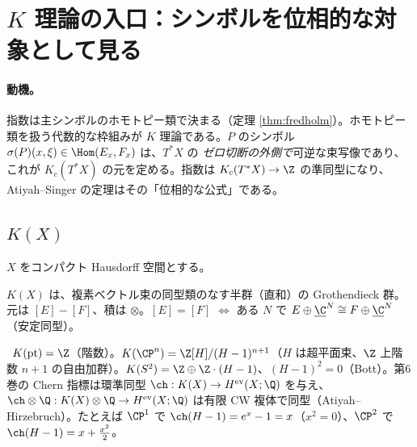 
\section{$K$ 理論の入口：シンボルを位相的な対象として見る}\label{sec:K}
\paragraph{動機。}指数は主シンボルのホモトピー類で決まる（定理 \ref{thm:fredholm}）。ホモトピー類を扱う代数的な枠組みが $K$ 理論である。$P$ のシンボル $\sigma(P)(x,\xi)\in\Hom(E_x,F_x)$ は、$T^*X$ の \emph{ゼロ切断の外側で}可逆な束写像であり、これが $K_c(T^*X)$ の元を定める。指数は $K_c(T^*X)\to\Z$ の準同型になり、Atiyah--Singer の定理はその「位相的な公式」である。

\subsection{$K(X)$}
$X$ をコンパクト Hausdorff 空間とする。
\begin{defn}[$K$ 群]\label{def:K}
$K(X)$ は、複素ベクトル束の同型類のなす半群（直和）の Grothendieck 群。元は $[E]-[F]$、積は $\otimes$。$[E]=[F]$ $\iff$ ある $N$ で $E\oplus\underline\C^N\cong F\oplus\underline\C^N$（安定同型）。
\end{defn}
\begin{ex}\label{ex:Kbasic}\tC\
$K(\mathrm{pt})=\Z$（階数）。$K(\CP^n)=\Z[H]/(H-1)^{n+1}$（$H$ は超平面束、$\Z$ 上階数 $n+1$ の自由加群）。$K(S^2)=\Z\oplus\Z\cdot(H-1)$、$(H-1)^2=0$（Bott）。第6巻の Chern 指標は環準同型 $\ch:K(X)\to H^{\rm ev}(X;\Q)$ を与え、$\ch\otimes\Q:K(X)\otimes\Q\to H^{\rm ev}(X;\Q)$ は有限 CW 複体で同型（Atiyah--Hirzebruch）。たとえば $\CP^1$ で $\ch(H-1)=e^x-1=x$（$x^2=0$）、$\CP^2$ で $\ch(H-1)=x+\frac{x^2}2$。
\end{ex}
